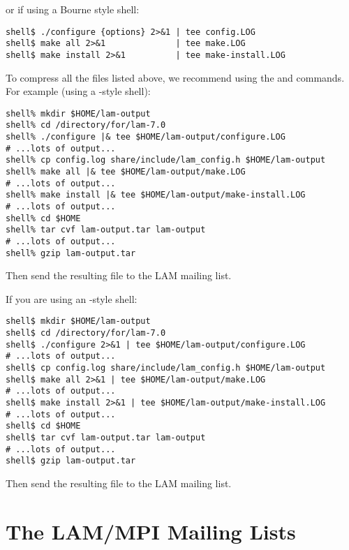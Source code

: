 \begin{enumerate}
or if using a Bourne style shell:

\lstset{style=lam-cmdline}
\begin{lstlisting}
shell$ ./configure {options} 2>&1 | tee config.LOG
shell$ make all 2>&1              | tee make.LOG
shell$ make install 2>&1          | tee make-install.LOG
\end{lstlisting}

To compress all the files listed above, we recommend using the
 and  commands. For example (using a
-style shell):

\lstset{style=lam-cmdline}
\begin{lstlisting}
shell% mkdir $HOME/lam-output
shell% cd /directory/for/lam-7.0 
shell% ./configure |& tee $HOME/lam-output/configure.LOG
# ...lots of output...
shell% cp config.log share/include/lam_config.h $HOME/lam-output
shell% make all |& tee $HOME/lam-output/make.LOG
# ...lots of output...
shell% make install |& tee $HOME/lam-output/make-install.LOG
# ...lots of output...
shell% cd $HOME
shell% tar cvf lam-output.tar lam-output
# ...lots of output...
shell% gzip lam-output.tar
\end{lstlisting}

Then send the resulting  file to the LAM
mailing list.

If you are using an -style shell:

\lstset{style=lam-cmdline}
\begin{lstlisting}
shell$ mkdir $HOME/lam-output
shell$ cd /directory/for/lam-7.0 
shell$ ./configure 2>&1 | tee $HOME/lam-output/configure.LOG
# ...lots of output...
shell$ cp config.log share/include/lam_config.h $HOME/lam-output
shell$ make all 2>&1 | tee $HOME/lam-output/make.LOG
# ...lots of output...
shell$ make install 2>&1 | tee $HOME/lam-output/make-install.LOG
# ...lots of output...
shell$ cd $HOME
shell$ tar cvf lam-output.tar lam-output
# ...lots of output...
shell$ gzip lam-output.tar
\end{lstlisting}

Then send the resulting  file to the LAM
mailing list.

\end{enumerate}


\section{The LAM/MPI Mailing Lists}
\label{sec:trouble:lists}

